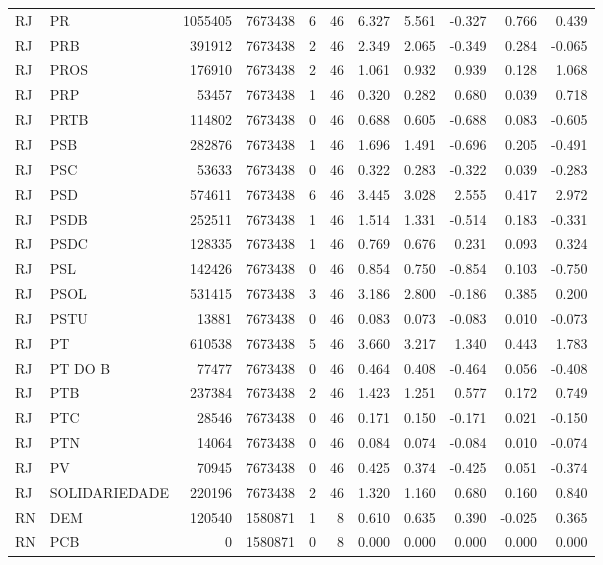 \begin{landscape}
\begin{longtable}{llrrrrrrrrr}
RJ & PR & 1055405 & 7673438 & 6 & 46 & 6.327 & 5.561 & -0.327 & 0.766 & 0.439 \\
RJ & PRB & 391912 & 7673438 & 2 & 46 & 2.349 & 2.065 & -0.349 & 0.284 & -0.065 \\
RJ & PROS & 176910 & 7673438 & 2 & 46 & 1.061 & 0.932 & 0.939 & 0.128 & 1.068 \\
RJ & PRP & 53457 & 7673438 & 1 & 46 & 0.320 & 0.282 & 0.680 & 0.039 & 0.718 \\
RJ & PRTB & 114802 & 7673438 & 0 & 46 & 0.688 & 0.605 & -0.688 & 0.083 & -0.605 \\
RJ & PSB & 282876 & 7673438 & 1 & 46 & 1.696 & 1.491 & -0.696 & 0.205 & -0.491 \\
RJ & PSC & 53633 & 7673438 & 0 & 46 & 0.322 & 0.283 & -0.322 & 0.039 & -0.283 \\
RJ & PSD & 574611 & 7673438 & 6 & 46 & 3.445 & 3.028 & 2.555 & 0.417 & 2.972 \\
RJ & PSDB & 252511 & 7673438 & 1 & 46 & 1.514 & 1.331 & -0.514 & 0.183 & -0.331 \\
RJ & PSDC & 128335 & 7673438 & 1 & 46 & 0.769 & 0.676 & 0.231 & 0.093 & 0.324 \\
RJ & PSL & 142426 & 7673438 & 0 & 46 & 0.854 & 0.750 & -0.854 & 0.103 & -0.750 \\
RJ & PSOL & 531415 & 7673438 & 3 & 46 & 3.186 & 2.800 & -0.186 & 0.385 & 0.200 \\
RJ & PSTU & 13881 & 7673438 & 0 & 46 & 0.083 & 0.073 & -0.083 & 0.010 & -0.073 \\
RJ & PT & 610538 & 7673438 & 5 & 46 & 3.660 & 3.217 & 1.340 & 0.443 & 1.783 \\
RJ & PT DO B & 77477 & 7673438 & 0 & 46 & 0.464 & 0.408 & -0.464 & 0.056 & -0.408 \\
RJ & PTB & 237384 & 7673438 & 2 & 46 & 1.423 & 1.251 & 0.577 & 0.172 & 0.749 \\
RJ & PTC & 28546 & 7673438 & 0 & 46 & 0.171 & 0.150 & -0.171 & 0.021 & -0.150 \\
RJ & PTN & 14064 & 7673438 & 0 & 46 & 0.084 & 0.074 & -0.084 & 0.010 & -0.074 \\
RJ & PV & 70945 & 7673438 & 0 & 46 & 0.425 & 0.374 & -0.425 & 0.051 & -0.374 \\
RJ & SOLIDARIEDADE & 220196 & 7673438 & 2 & 46 & 1.320 & 1.160 & 0.680 & 0.160 & 0.840 \\
RN & DEM & 120540 & 1580871 & 1 & 8 & 0.610 & 0.635 & 0.390 & -0.025 & 0.365 \\
RN & PCB & 0 & 1580871 & 0 & 8 & 0.000 & 0.000 & 0.000 & 0.000 & 0.000 \\

\end{longtable}
\end{landscape}
